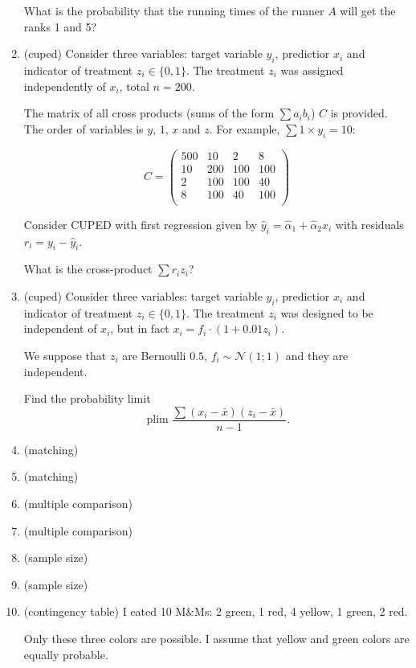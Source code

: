 \documentclass[12pt]{article}
\DeclareMathOperator{\plim}{plim}
\newcommand{\cN}{\mathcal{N}}
\begin{document}
\begin{enumerate}
    What is the probability that the running times of the runner $A$ will get the ranks 1 and 5?
    
    \item (cuped) Consider three variables: target variable $y_i$, predictior $x_i$ and indicator of treatment $z_i \in \{0,1\}$.
    The treatment $z_i$ was assigned independently of $x_i$, total $n=200$. 

    The matrix of all cross products (sums of the form $\sum a_i b_i$) $C$ is provided. 
    The order of variables is $y$, $1$, $x$ and $z$. For example, $\sum 1 \times y_i = 10$:

    \[
    C = \begin{pmatrix}
        500 & 10 & 2 & 8 \\
        10 & 200 & 100 & 100 \\
        2 &  100 & 100 &  40   \\
        8 &  100 & 40  & 100 \\
    \end{pmatrix}    
    \]
    
    Consider CUPED with first regression given by $\hat y_i = \hat\alpha_1 + \hat\alpha_2 x_i$ with residuals $r_i = y_i - \hat y_i$.

    What is the cross-product $\sum r_i z_i$?


    \item (cuped) Consider three variables: target variable $y_i$, predictior $x_i$ and indicator of treatment $z_i \in \{0,1\}$.
    The treatment $z_i$ was designed to be independent of $x_i$, but in fact $x_i = f_i \cdot (1 + 0.01 z_i)$.

    We suppose that $z_i$ are Bernoulli $0.5$, $f_i \sim \cN(1;1)$ and they are independent.

    Find the probability limit 
    \[
    \plim \frac{\sum (x_i - \bar x)(z_i - \bar x)}{n-1}.    
    \]


    \item (matching)
    \item (matching)
    \item (multiple comparison)
    \item (multiple comparison)
    \item (sample size)
    \item (sample size)
    \item (contingency table) I eated 10 M\&Ms: 2 green, 1 red, 4 yellow, 1 green, 2 red.  
    
    Only these three colors are possible. I assume that yellow and green colors are equally probable.  
    

\end{enumerate}
\end{document}
